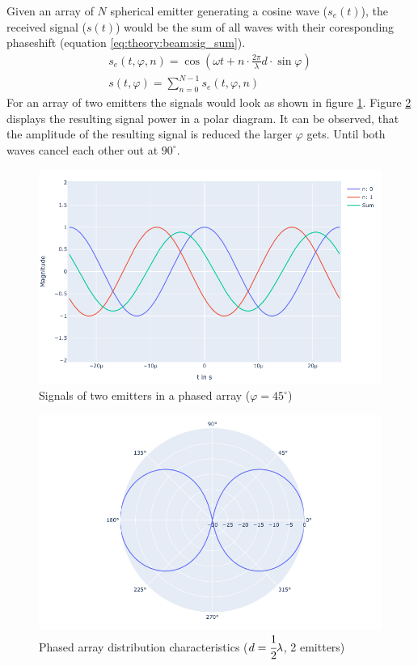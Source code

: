 %
Given an array of $N$ spherical emitter generating a cosine wave (\(s_e(t)\)), the received signal (\(s(t)\)) would be the sum of all waves with their coresponding phaseshift (equation \ref{eq:theory:beam:sig_sum}).\cite{curtis_technology_uk_ltd_time_1998}
%
\begin{align}
  s_e(t, \varphi, n) = \cos (\omega t + n \cdot \frac{2\pi}{\lambda} d \cdot \sin \varphi )\label{eq:theory:beam:sig}\\[1em]
  s(t, \varphi) = \sum_{n = 0}^{N - 1} s_e(t, \varphi, n)\label{eq:theory:beam:sig_sum}
\end{align}
%
For an array of two emitters the signals would look as shown in figure \ref{fig:theory:beam:time}.
Figure \ref{fig:theory:beam:n2_d.5} displays the resulting signal power in a polar diagram.\cite{curtis_technology_uk_ltd_time_1998}\p
%
It can be observed, that the amplitude of the resulting signal is reduced the larger \(\varphi\) gets. Until both waves cancel each other out at \(90^\circ\).
%
\begin{figure}
  \centering
  \includegraphics[height=\mediumheight]{src/assets/pictures/theory/beam_time_n2_45deg.png}
  \caption{Signals of two emitters in a phased array ($\varphi=45^\circ$)}
  \label{fig:theory:beam:time}
\end{figure}
%
\begin{figure}
  \centering
  \includegraphics[height=\mediumheight]{src/assets/pictures/theory/beam_n2_d0.5.png}
  \caption{Phased array distribution characteristics ($d = \cfrac{1}{2}\lambda$, 2 emitters)}\label{fig:theory:beam:n2_d.5}
\end{figure}
\clearpage
